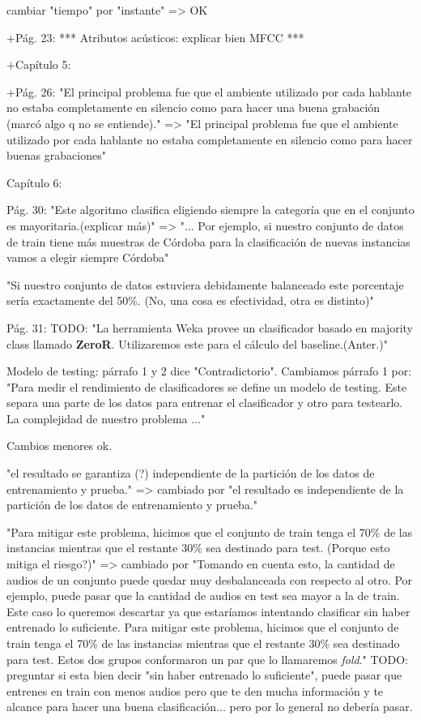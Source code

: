 cambiar "tiempo" por "instante" => OK

+Pág. 23: *** Atributos acústicos: explicar bien MFCC ***

+Capítulo 5: 

+Pág. 26: "El principal problema fue que el ambiente utilizado por cada hablante no estaba completamente en silencio como para hacer una buena grabación (marcó algo q no se entiende)." => "El principal problema fue que el ambiente utilizado por cada hablante no estaba completamente en silencio como para hacer buenas grabaciones"

Capítulo 6:

Pág. 30: "Este algoritmo clasifica eligiendo siempre la categoría que en el conjunto es mayoritaria.(explicar más)" => "... Por ejemplo, si nuestro conjunto de datos de train tiene más muestras de Córdoba para la clasificación de nuevas instancias vamos a elegir siempre Córdoba"

"Si nuestro conjunto de datos estuviera debidamente balanceado este porcentaje sería exactamente del 50\%. (No, una cosa es efectividad, otra es distinto)"

Pág. 31:
TODO: "La herramienta Weka provee un clasificador basado en majority class llamado \textbf{ZeroR}. Utilizaremos este para el cálculo del baseline.(Anter.)"

Modelo de testing: párrafo 1 y 2 dice "Contradictorio". Cambiamos párrafo 1 por:
"Para medir el rendimiento de clasificadores se define un modelo de testing. Este separa una parte de los datos para entrenar el clasificador y otro para testearlo. La complejidad de nuestro problema ..."

Cambios menores ok.

"el resultado se garantiza (?) independiente de la partición de los datos de entrenamiento y prueba." => cambiado por "el resultado es independiente de la partición de los datos de entrenamiento y prueba."

"Para mitigar este problema, hicimos que el conjunto de train tenga el 70\% de las instancias mientras que el restante 30\% sea destinado para test. (Porque esto mitiga el riesgo?)" => cambiado por 
"Tomando en cuenta esto, la cantidad de audios de un conjunto puede quedar muy desbalanceada con respecto al otro. Por ejemplo, puede pasar que la cantidad de audios en test sea mayor a la de train. Este caso lo queremos descartar ya que estaríamos intentando clasificar sin haber entrenado lo suficiente. Para mitigar este problema, hicimos que el conjunto de train tenga el 70\% de las instancias mientras que el restante 30\% sea destinado para test. Estos dos grupos conformaron un par que lo llamaremos \textit{fold}." 
TODO: preguntar si esta bien decir "sin haber entrenado lo suficiente", puede pasar que entrenes en train con menos audios pero que te den mucha información y te alcance para hacer una buena clasificación... pero por lo general no debería pasar.

